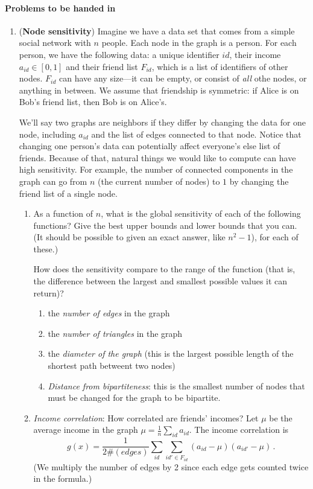 \documentclass[11pt]{article}
\begin{document}
 \paragraph{Problems to be handed in}
\begin{enumerate}[leftmargin=\parindent, itemsep=3ex]

  
\item (\textbf{Node sensitivity}) Imagine we have a data set
  that comes from a simple social network with $n$ people. Each node in the graph is a
  person. For each person, we have the following data: a unique
  identifier $id$, their income $a_{id} \in [0,1]$
  and their friend list $F_{id}$, which is a list of identifiers
  of other nodes. $F_{id}$ can have any size---it can be empty, or
  consist of \emph{all} othe nodes, or anything in between. We
  assume that friendship is symmetric: if Alice is on Bob's friend
  list, then Bob is on Alice's.

  We'll say two graphs are neighbors if they differ by changing the
  data for one node, including $a_{id}$ and the list of edges connected
  to that node. Notice that changing one person's data can potentially
  affect everyone's else list of friends.
  Because of that, natural things
  we would like to compute can have high sensitivity. For example, the
  number of connected components in the graph can go from $n$ (the
  current number of nodes) to $1$
  by changing the friend list of  a single node. 
  
  \begin{enumerate}
  \item As a function of $n$, what is the global sensitivity of each
    of the following functions? Give the best upper bounds and lower
    bounds that you can. (It should be possible to given an exact
    answer, like $n^2-1$), for each of these.)

    How does the sensitivity compare to the range of the function
    (that is, the difference between the largest and smallest possible
    values it can return)?
    \begin{enumerate}
    \item the \emph{number of edges} in the graph
    \item the \emph{number of triangles} in the graph
    \item the \emph{diameter of the graph} (this is the largest
      possible length of the shortest path betweent two nodes)
    \item \emph{Distance from bipartiteness}: this is the smallest
      number of nodes that must be changed for the graph to be
      bipartite.
    \end{enumerate}
  \item \emph{Income correlation}: How correlated are friends'
    incomes? Let $\mu$ be the average income in the graph 
    $\mu = \frac 1 n \sum_{id} a_{id}$. The income correlation is
    $$g(x) =  \frac 1{2\# (edges)} \sum_{id} \sum_{id' \in F_{id}}
    (a_{id}-\mu)(a_{id'}-\mu)\, .$$
    (We multiply the number of edges by 2 since each edge gets
    counted twice in the formula.)
    

\end{enumerate}
\end{enumerate}
\end{document}
